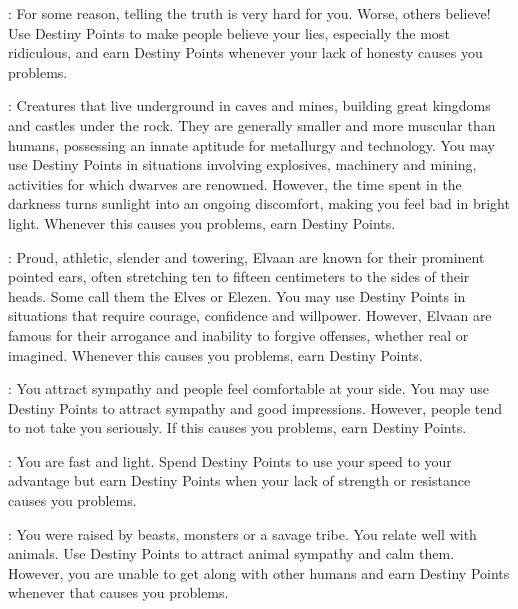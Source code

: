 \begin{multicols}{2}
\begin{ffcolpage}
\end{ffcolpage} \pw \begin{ffcolpage}
: For some reason, telling the truth is very hard for you. Worse, others believe! Use Destiny Points to make people believe your lies, especially the most ridiculous, and earn Destiny Points whenever your lack of honesty causes you problems.
\end{ffcolpage} \pw \begin{minipage}{.35\textwidth-2\columnsep}
: Creatures that live underground in caves and mines, building great kingdoms and castles under the rock. They are generally smaller and more muscular than humans, possessing an innate aptitude for metallurgy and technology. You may use Destiny Points in situations involving explosives, machinery and mining, activities for which dwarves are renowned. However, the time spent in the darkness turns sunlight into an ongoing discomfort, making you feel bad in bright light. Whenever this causes you problems, earn Destiny Points.
\end{minipage} \pw \begin{minipage}{.35\textwidth-2\columnsep}
: Proud, athletic, slender and towering, Elvaan are known for their prominent pointed ears, often stretching ten to fifteen centimeters to the sides of their heads. Some call them the Elves or Elezen. You may use Destiny Points in situations that require courage, confidence and willpower. However, Elvaan are famous for their arrogance and inability to forgive offenses, whether real or imagined. Whenever this causes you problems, earn Destiny Points.
\end{minipage} \pw \begin{ffcolpage}
: You attract sympathy and people feel comfortable at your side. You may use Destiny Points to attract sympathy and good impressions. However, people tend to not take you seriously. If this causes you problems, earn Destiny Points.
\end{ffcolpage} \pw \begin{ffcolpage}
: You are fast and light. Spend Destiny Points to use your speed to your advantage but earn Destiny Points when your lack of strength or resistance causes you problems.
\end{ffcolpage} \pw \begin{ffcolpage}
: You were raised by beasts, monsters or a savage tribe. You relate well with animals. Use Destiny Points to attract animal sympathy and calm them. However, you are unable to get along with other humans and earn Destiny Points whenever that causes you problems.

\end{ffcolpage}
\end{multicols}
